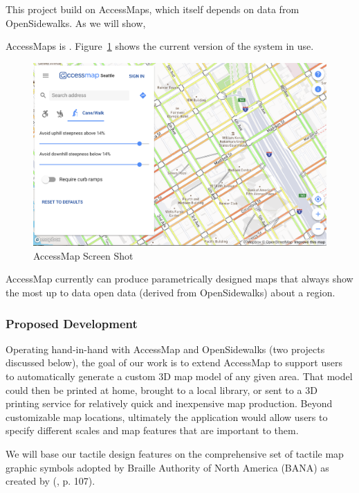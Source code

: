 This project build on AccessMaps, which itself depends on data from OpenSidewalks. As we will show, 




AccessMaps is .
Figure~\ref{fig:accessmap} shows the current version of the system in use. 

\begin{figure}
    \centering
    \includegraphics[width=5in]{pics/accessmap.png}
    \caption{AccessMap Screen Shot}
    \label{fig:accessmap}
\end{figure}

AccessMap currently can produce parametrically designed maps that always show the most up to data open data (derived from OpenSidewalks) about a region. 

\subsubsection{Proposed Development}

Operating hand-in-hand with AccessMap and OpenSidewalks (two projects discussed below), the goal of our work is to extend AccessMap to support users to automatically generate a custom 3D map model of any given area.  That model could then be printed at home, brought to a local library, or sent to a 3D printing service for relatively quick and inexpensive map production.  Beyond customizable map locations, ultimately the application would allow users to specify different scales and map features that are important to them.  

We will base our tactile design features on the comprehensive set of tactile map graphic symbols adopted by Braille Authority of North America (BANA) as created by (\cite{lobben2012tactile}, p. 107).%


